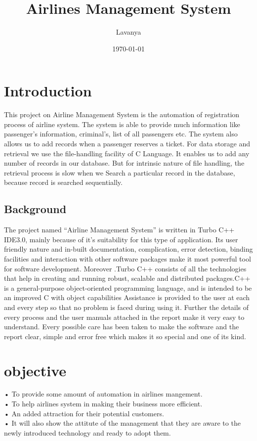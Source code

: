 \documentclass{report}
\title{Airlines Management System}
\author{Lavanya}
\date{\today}
\begin{document}
\maketitle
\tableofcontents
\chapter{Introduction}
This project on Airline Management System is the automation of registration process of airline system. The system is able to provide much information like passenger’s information, criminal’s, list of all passengers etc. The system also allows us to add records when a passenger reserves a ticket. For data storage and retrieval we use the file-handling facility of C Language. It enables us to add any number of records in our database. But for intrinsic nature of file handling, the retrieval process is slow when we
Search a particular record in the database, because record  is searched sequentially.
\section{Background}
The project named “Airline Management System” is written in Turbo C++ IDE3.0, mainly because of it’s suitability for this type of application. Its user friendly nature and in-built documentation, complication, error detection, binding facilities and interaction with other software packages make it most powerful tool for software development. Moreover .Turbo C++ consists of all the technologies that help in creating and running robust, scalable and distributed packages.C++ is a general-purpose object-oriented programming language, and is intended to be an improved C with object capabilities
Assistance is provided to the user at each and every step so that no problem is faced during using it. Further the details of every process and the user manuals attached in the report make it very easy to understand. Every possible care has been taken to make the software and the report clear, simple and error free which makes it so special and one of its kind.
\chapter{objective}
    • To provide some amount of automation in  airlines mangement.\\
    • To help airlines system in making their business more efficient.\\
    • An added attraction for their potential customers.\\
    • It will also show the attitute of the management that they are aware to the newly
      introduced technology and ready to adopt them.
\end{document}
